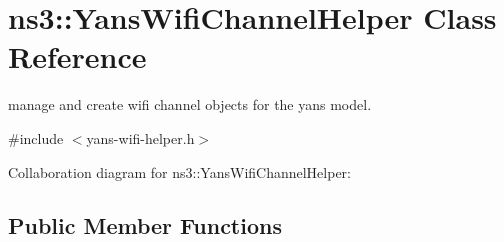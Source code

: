 \hypertarget{classns3_1_1YansWifiChannelHelper}{}\section{ns3\+:\+:Yans\+Wifi\+Channel\+Helper Class Reference}
\label{classns3_1_1YansWifiChannelHelper}


manage and create wifi channel objects for the yans model.  




{\ttfamily \#include $<$yans-\/wifi-\/helper.\+h$>$}



Collaboration diagram for ns3\+:\+:Yans\+Wifi\+Channel\+Helper\+:
\subsection*{Public Member Functions}
